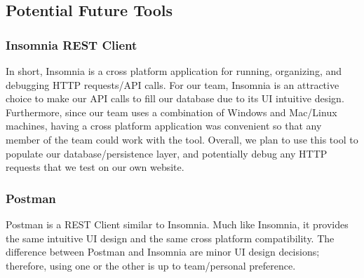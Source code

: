 \documentclass{scrartcl}
\begin{document}
\subsection{Potential Future Tools}
\subsubsection{Insomnia REST Client}
In short, Insomnia is a cross platform application for running, organizing, and debugging HTTP requests/API calls. For our team, Insomnia is an attractive choice to make our API calls to fill our database due to its UI intuitive design. Furthermore, since our team uses a combination of Windows and Mac/Linux machines, having a cross platform application was convenient so that any member of the team could work with the tool. Overall, we plan to use this tool to populate our database/persistence layer, and potentially debug any HTTP requests that we test on our own website.

\subsubsection{Postman}
Postman is a REST Client similar to Insomnia. Much like Insomnia, it provides the same intuitive UI design and the same cross platform compatibility. The difference between Postman and Insomnia are minor UI design decisions; therefore, using one or the other is up to team/personal preference.
\end{document}
